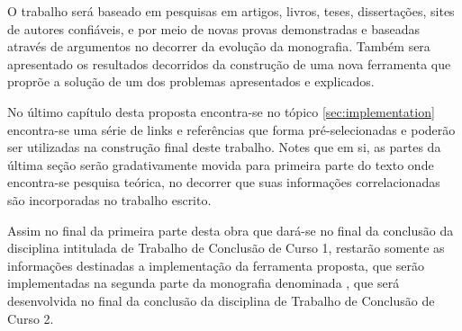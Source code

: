     O trabalho será baseado em pesquisas em artigos, livros, teses,
    dissertações, sites de autores confiáveis, e por meio de novas provas
    demonstradas e baseadas através de argumentos no decorrer da evolução da
    monografia. Também sera apresentado os resultados decorridos da construção
    de uma nova ferramenta que proprõe a solução de um dos problemas
    apresentados e explicados.

    No último capítulo desta proposta encontra-se no tópico
    \autoref{sec:implementation} encontra-se uma série de links e referências
    que forma pré-selecionadas e poderão ser utilizadas na construção final
    deste trabalho. Notes que em si, as partes da última seção serão
    gradativamente movida para primeira parte do texto onde encontra-se pesquisa
    teórica, no decorrer que suas informações correlacionadas são incorporadas
    no trabalho escrito.

    Assim no final da primeira parte desta obra que dará-se no final da
    conclusão da disciplina intitulada de Trabalho de Conclusão de Curso 1,
    restarão somente as informações destinadas a implementação da ferramenta
    proposta, que serão implementadas na segunda parte da monografia denominada
    , que será desenvolvida no final da conclusão da
    disciplina de Trabalho de Conclusão de Curso 2.


